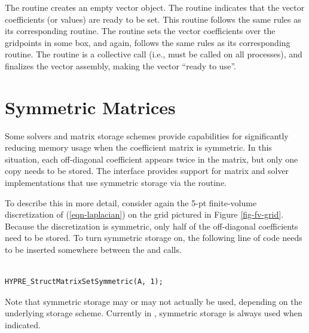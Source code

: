 The  routine creates an empty vector object.  The
 routine indicates that the vector coefficients
(or values) are ready to be set.  This routine follows the same rules
as its corresponding  routine.  The 
routine sets the vector coefficients over the gridpoints in some box,
and again, follows the same rules as its corresponding 
routine.  The  routine is a collective call (i.e.,
must be called on all processes), and finalizes the vector assembly,
making the vector ``ready to use''.


\section{Symmetric Matrices}
\label{Symmetric Matrices}

Some solvers and matrix storage schemes provide capabilities for
significantly reducing memory usage when the coefficient matrix is
symmetric.  In this situation, each off-diagonal coefficient appears
twice in the matrix, but only one copy needs to be stored.  The
 interface provides support for matrix and solver
implementations that use symmetric storage via the
 routine.

To describe this in more detail, consider again the 5-pt finite-volume
discretization of (\ref{eqn-laplacian}) on the grid pictured in Figure
\ref{fig-fv-grid}.  Because the discretization is symmetric, only half
of the off-diagonal coefficients need to be stored.  To turn symmetric
storage on, the following line of code needs to be inserted somewhere
between the  and  calls.
\begin{display}
\begin{verbatim}

HYPRE_StructMatrixSetSymmetric(A, 1);

\end{verbatim}
\end{display}
Note that symmetric storage may or may not actually be used, depending
on the underlying storage scheme.  Currently in \hypre{}, symmetric
storage is always used when indicated.

